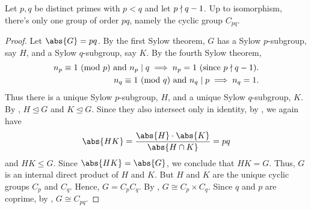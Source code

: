 \begin{theorem} \label{thm:class-pq-pnmid-q-1}
    Let $p,q$ be distinct primes with $p < q$ and let $p \nmid q-1$. Up to isomorphism, there's only one group of order $pq$, namely the cyclic group $C_{pq}$.
\end{theorem}
\begin{proof}
    Let $\abs{G} = pq$. By the first Sylow theorem, $G$ has a Sylow $p$-subgroup, say $H$, and a Sylow $q$-subgroup, say $K$. By the fourth Sylow theorem,
    \begin{align*}
        n_p \equiv 1 \ (\mathrm{mod}\ p) \text{ and } n_p \mid q \implies n_p = 1 \text{ (since $p \nmid q-1$)}. \\
        n_q \equiv 1 \ (\mathrm{mod}\ q) \text{ and } n_q \mid p \implies n_q = 1.
    \end{align*}
    Thus there is a unique Sylow $p$-subgroup, $H$, and a unique Sylow $q$-subgroup, $K$. By , $H \trianglelefteq G$ and $K \trianglelefteq G$. Since they also intersect only in identity, by , we again have
    \[
        \abs{HK} = \frac{\abs{H} \cdot \abs{K}}{\abs{H \cap K}} = pq
    \]
    and $HK \leq G$. Since $\abs{HK} = \abs{G}$, we conclude that $HK = G$. Thus, $G$ is an internal direct product of $H$ and $K$. But $H$ and $K$ are the unique cyclic groups $C_p$ and $C_q$. Hence, $G = C_p C_q$. By , $G \cong C_p \times C_q$. Since $q$ and $p$ are coprime, by , $G \cong C_{pq}$.
\end{proof}

